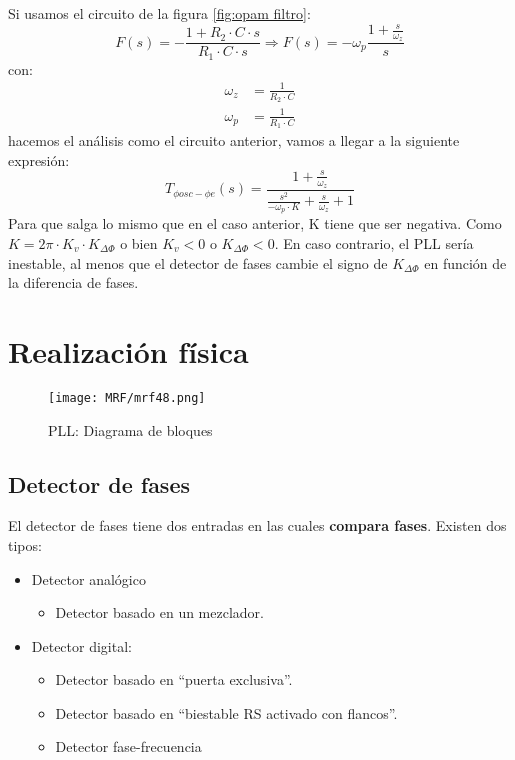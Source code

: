 \documentclass[
	12pt, %
	fleqn, %
	a4paper, %
	oneside, %
]{LegrandOrangeBook}
\begin{document}
Si usamos el circuito de la figura \ref{fig:opam filtro}:
\begin{displaymath}
F(s)=-\frac{1+R_2\cdot C\cdot s}{R_1\cdot C\cdot s}\Rightarrow F(s)=-\omega_p\frac{1+\frac{s}{\omega_z}}{s}
\end{displaymath}
con: 
\begin{align*}
\omega_z&=\frac{1}{R_2\cdot C}\\
\omega_p&=\frac{1}{R_1\cdot C}
\end{align*}
hacemos el análisis como el circuito anterior, vamos a llegar a la siguiente expresión:
\begin{displaymath}
T_{\phi osc-\phi e}(s)=\frac{1+\frac{s}{\omega_z}}{\frac{s^2}{-\omega_p\cdot K}+\frac{s}{\omega_z}+1}
\end{displaymath}
Para que salga lo mismo que en el caso anterior, K tiene que ser negativa. Como $K=2\pi\cdot K_v\cdot K_{\Delta\Phi}$ o bien $K_v<0$ o $K_{\Delta\Phi}<0$. En caso contrario, el PLL sería inestable, al menos que el detector de fases cambie el signo de $K_{\Delta\Phi}$ en función de la diferencia de fases.
\section{Realización física}
\begin{figure}[H]
\centering
\texttt{[image: MRF/mrf48.png]}
\caption{PLL: Diagrama de bloques}
\end{figure}
\subsection{Detector de fases}
El detector de fases tiene dos entradas en las cuales \textbf{compara fases}. Existen dos tipos:
\begin{itemize}
\item Detector analógico
\begin{itemize}
\item Detector basado en un mezclador.
\end{itemize}
\item Detector digital:
\begin{itemize}
\item Detector basado en ``puerta exclusiva''.
\item Detector basado en ``biestable RS activado con flancos''.
\item Detector fase-frecuencia
\end{itemize}
\end{itemize}
\end{document}
